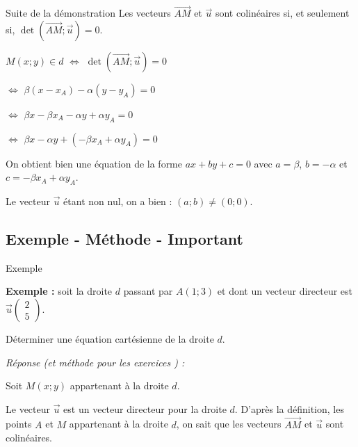 \documentclass[12pt]{beamer}
\begin{document}
\begin{frame}{Suite de la démonstration}
Les vecteurs $\overrightarrow{AM}$ et $\overrightarrow{u}$ sont colinéaires si, et seulement si, $\det(\overrightarrow{AM} ; \overrightarrow{u}) = 0$.

\medskip

$M(x;y) \in d$ $\Longleftrightarrow$ $\det(\overrightarrow{AM} ; \overrightarrow{u}) = 0$ \par 
\phantom{$M(x;y) \in d$} $\Longleftrightarrow$ $\beta(x-x_A) - \alpha (y-y_A) = 0$ \par 
\phantom{$M(x;y) \in d$} $\Longleftrightarrow$ $\beta x -\beta x_A - \alpha y + \alpha y_A = 0$ \par 
\phantom{$M(x;y) \in d$} $\Longleftrightarrow$ $\beta x - \alpha y + (-\beta x_A + \alpha y_A) = 0$

\bigskip

On obtient bien une équation de la forme $ax+by+c = 0$ avec $a = \beta$, $b = -\alpha$ et $c = -\beta x_A + \alpha y_A$. \par 
Le vecteur $\overrightarrow{u}$ étant non nul, on a bien : $(a;b) \neq (0;0)$.
\end{frame}

\subsection{Exemple - Méthode - Important}

\begin{frame}{Exemple}

\textbf{Exemple : } soit la droite $d$ passant par $A(1;3)$ et dont un vecteur directeur est $\overrightarrow{u} \begin{pmatrix} 2 \\ 5\end{pmatrix}$. \par 
Déterminer une équation cartésienne de la droite $d$. 

\bigskip

\textit{Réponse (et méthode pour les exercices ) :}

\medskip

Soit $M(x;y)$ appartenant à la droite $d$. 

\medskip

Le vecteur $\overrightarrow{u}$ est un vecteur directeur pour la droite $d$. D'après la définition, les points $A$ et $M$ appartenant à la droite $d$, on sait que les vecteurs $\overrightarrow{AM}$ et $\overrightarrow{u}$ sont colinéaires. 
\end{frame}
\end{document}
